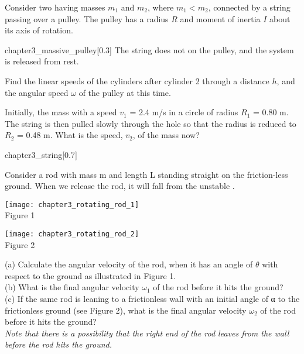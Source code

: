 \begin{example}
	Consider two  having masses $m_1$
	and $m_2$, where $m_1 < m_2$, connected by a
	string passing over a pulley. The pulley
	has a radius $R$ and moment of inertia $I$
	about its axis of rotation.
	\begin{singlefigure}{chapter3_massive_pulley}[0.3]
		The string does
		not  on the pulley, and the system
		is released from rest. 
	\end{singlefigure}
	 Find the linear
	speeds of the cylinders after
	cylinder 2  through a
	distance $h$, and the angular
	speed $\omega$ of the pulley at this time.
\end{example}
\begin{example}
	Initially, the mass  with a speed $v_1$ = 2.4 m/s in
	a circle of radius $R_1$ = 0.80 m.
	The string is then pulled slowly through the hole so
	that the radius is reduced to $R_2$ = 0.48 m. What is the
	speed, $v_2$, of the mass now?
	\begin{singlefigure}{chapter3_string}[0.7]
	\end{singlefigure}
\end{example}
\begin{example}
	Consider a rod with mass m and length L standing straight on the friction-less ground. When we
	release the rod, it will fall from the unstable .
	\begin{center}
		\begin{minipage}{0.45\textwidth}
			\centering
			\texttt{[image: chapter3\_rotating\_rod\_1]}\\
			Figure 1
		\end{minipage}
		\quad
		\begin{minipage}{0.45\textwidth}
			\centering
			\texttt{[image: chapter3\_rotating\_rod\_2]}\\
			Figure 2
		\end{minipage}
	\end{center}
	(a) Calculate the angular velocity of the rod, when it has an angle of $\theta$ with respect to the ground
	as illustrated in Figure 1.\\
	(b) What is the final angular velocity $\omega_1$ of the rod before it hits the ground?\\
	(c) If the same rod is leaning to a frictionless wall with an initial angle of α to the frictionless
	ground (see Figure 2), what is the final angular velocity $\omega_2$ of the rod before it hits the ground?\\
	{\em Note that there is a possibility that the right end of the rod leaves from the wall before the rod hits the ground.}
\end{example}